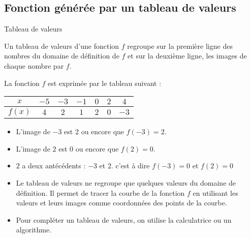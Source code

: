 \begin{pageCours}


\subsection{Fonction générée par un tableau de valeurs}


\begin{DefT}{Tableau de valeurs}

Un tableau de valeurs d'une fonction $f$ regroupe sur la première ligne des nombres du domaine de définition de $f$ et sur la deuxième ligne, les images de chaque nombre par $f$.

\end{DefT}

 
\begin{Ex}

\begin{minipage}{0.5\linewidth}

La fonction $f$ est exprimée par le tableau suivant :

\begin{tabular}{|c|c|c|c|c|c|c|}
\hline 
$x$ & $-5$ &  $-3$ &  $-1$ &  $0$ &  $2$ &  $4$\\ 
\hline   
$f(x)$ & $4$ & $2$ & $1$ & $2$ & $0$ & $-3$ \\ 
\hline 
\end{tabular} 
\end{minipage}
\begin{minipage}{0.5\linewidth}
\begin{itemize}[leftmargin=*]
\item L'image de $-3$ est $2$ ou encore que $f(-3)=2$.
\item L'image de $2$ est $0$ ou encore que $f(2)=0$.
\item $2$ a deux antécédents : $-3$ et $2$. c'est à dire $f(-3)=0$ et $f(2)=0$
\end{itemize}
\end{minipage}
\end{Ex}

 
 
\begin{Rq}
\begin{itemize}
\item Le tableau de valeurs ne regroupe que quelques valeurs du domaine de définition. Il permet de tracer la courbe de la fonction $f$ en utilisant les valeurs et leurs images comme coordonnées des points de la courbe. 
\item Pour compléter un tableau de valeurs, on utilise la calculatrice ou un algorithme.
\end{itemize}
\end{Rq}


\end{pageCours}
